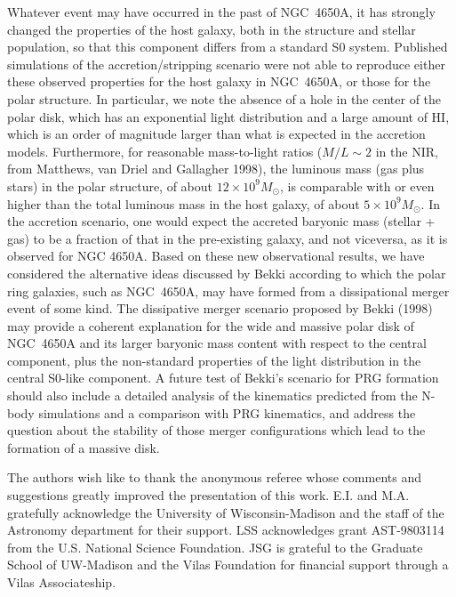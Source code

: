 \documentclass[preprint]{aastex}
\begin{document}
Whatever event may have occurred in the past of NGC~4650A, it has strongly 
changed the properties of the host galaxy, both in the structure and stellar 
population, so that this component differs from a standard S0 system.
Published simulations of the accretion/stripping scenario 
were not able to reproduce either these observed properties for the host galaxy in 
NGC~4650A, or those for the polar structure.
In particular, we note the absence of a hole in the center of the polar disk,
which has an exponential light distribution and a large amount of HI, which is
an order of magnitude larger than what is expected in the accretion models.
Furthermore, for reasonable mass-to-light ratios ($M/L \sim 2$ in the NIR, 
from Matthews, van Driel and Gallagher 1998), 
the luminous mass (gas plus stars) in the polar structure, of about 
$12 \times 10^{9} M_\odot$, is comparable with or even higher than the total 
luminous mass in the host galaxy, of about $5 \times 10^{9} M_\odot$.
In the accretion scenario, one would expect the accreted baryonic mass (stellar + gas)
to be a fraction of that in the pre-existing galaxy, and not viceversa,
as it is observed for NGC 4650A. 
Based on these new observational results, we have considered the alternative ideas
discussed by Bekki according to which the polar ring galaxies, 
such as NGC~4650A, may have formed from a dissipational merger event of 
some kind. The dissipative merger scenario proposed by Bekki (1998) may 
provide a coherent explanation for the wide and massive polar disk of NGC~4650A
and its larger baryonic mass content with respect to the central component,
plus the non-standard properties of the light distribution in the 
central S0-like component.
A future test of Bekki's scenario for PRG formation should also include
a detailed analysis of the kinematics predicted from the N-body simulations
and a comparison with PRG kinematics, and address the question about the stability 
of those merger configurations which lead to the formation of a massive disk.



\acknowledgments
The authors wish like to thank the anonymous referee whose comments and
suggestions greatly improved the presentation of this work.
E.I. and M.A. gratefully acknowledge the University of 
Wisconsin-Madison and the staff of the Astronomy department for 
their support. LSS acknowledges grant AST-9803114 from the
U.S. National Science Foundation.  JSG is grateful to the Graduate
School of UW-Madison and the Vilas Foundation for financial support
through a Vilas Associateship.
\end{document}
